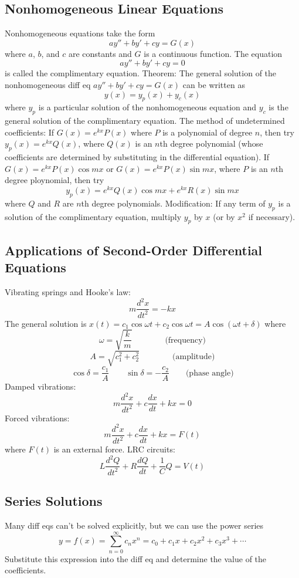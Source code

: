 \documentclass{article}
\begin{document}
    \subsection{Nonhomogeneous Linear Equations}
    \begin{outline}
        \1 Nonhomogeneous equations take the form \[ay''+by'+cy=G(x)\] where $a$, $b$, and $c$ are constants and $G$ is a continuous function. The equation \[ay''+by'+cy=0\] is called the complimentary equation. 
        \1 Theorem: The general solution of the nonhomogeneous diff eq \(ay''+by'+cy=G(x)\) can be written as \[y(x)=y_p(x)+y_c(x)\] where $y_p$ is a particular solution of the nonhomogeneous equation and $y_c$ is the general solution of the complimentary equation. 
        \1 The method of undetermined coefficients: 
            \2 If \(G(x)=e^{kx}P(x)\) where $P$ is a polynomial of degree $n$, then try \(y_p(x)=e^{kx}Q(x)\), where \(Q(x)\) is an $n$th degree polynomial (whose coefficients are determined by substituting in the differential equation). 
            \2 If \(G(x)=e^{kx}P(x)\cos mx\) or \(G(x)=e^{kx}P(x)\sin mx\), where $P$ is an $n$th degree ploynomial, then try \[y_p(x)=e^{kx}Q(x)\cos mx+e^{kx}R(x)\sin mx\] where $Q$ and $R$ are $n$th degree polynomials. 
            \2 Modification: If any term of $y_p$ is a solution of the complimentary equation, multiply $y_p$ by $x$ (or by $x^2$ if necessary). 

    \end{outline}
    \subsection{Applications of Second-Order Differential Equations}
    \begin{outline}
        \1 Vibrating springs and Hooke's law: \[m\dfrac{d^2x}{dt^2}=-kx\] The general solution is \(x(t)=c_1\cos\omega t+c_2\cos\omega t=A\cos(\omega t+\delta)\) where \[\omega=\sqrt{\dfrac{k}{m}}\qquad\qquad\text{(frequency)}\]\[A=\sqrt{c_1^2+c_2^2}\qquad\qquad\text{(amplitude)}\]\[\cos\delta=\dfrac{c_1}{A}\qquad\sin\delta=-\dfrac{c_2}{A}\qquad\text{(phase angle)}\]
        \1 Damped vibrations: \[m\dfrac{d^2x}{dt^2}+c\dfrac{dx}{dt}+kx=0\]
        \1 Forced vibrations: \[m\dfrac{d^2x}{dt^2}+c\dfrac{dx}{dt}+kx=F(t)\] where \(F(t)\) is an external force. 
        \1 LRC circuits: \[L\dfrac{d^2Q}{dt^2}+R\dfrac{dQ}{dt}+\dfrac{1}{C}Q=V(t)\]
    \end{outline}
    \subsection{Series Solutions}
    \begin{outline}
        \1 Many diff eqs can't be solved explicitly, but we can use the power series \[y=f(x)=\sum^\infty_{n=0}c_nx^n=c_0+c_1x+c_2x^2+c_3x^3+\cdots\]
        \1 Substitute this expression into the diff eq and determine the value of the coefficients. 
    \end{outline}
\end{document}
